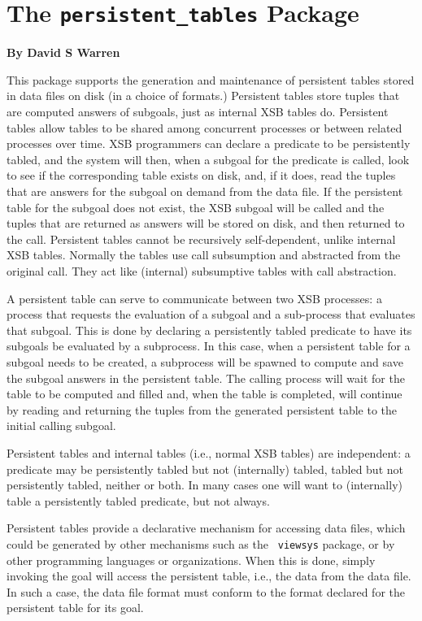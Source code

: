 
\chapter{The {\tt persistent\_tables} Package}

  \begin{center}
    {\Large {\bf By David S Warren}}
  \end{center}

This package supports the generation and maintenance of persistent
tables stored in data files on disk (in a choice of formats.)
Persistent tables store tuples that are computed answers of subgoals,
just as internal XSB tables do.  Persistent tables allow tables to be
shared among concurrent processes or between related processes over
time.  XSB programmers can declare a predicate to be persistently
tabled, and the system will then, when a subgoal for the predicate is
called, look to see if the corresponding table exists on disk, and, if
it does, read the tuples that are answers for the subgoal on demand
from the data file.  If the persistent table for the subgoal does not
exist, the XSB subgoal will be called and the tuples that are returned
as answers will be stored on disk, and then returned to the call.
Persistent tables cannot be recursively self-dependent, unlike
internal XSB tables.  Normally the tables use call subsumption and
abstracted from the original call.  They act like (internal)
subsumptive tables with call abstraction.

A persistent table can serve to communicate between two XSB processes:
a process that requests the evaluation of a subgoal and a sub-process
that evaluates that subgoal.  This is done by declaring a persistently
tabled predicate to have its subgoals be evaluated by a subprocess.
In this case, when a persistent table for a subgoal needs to be
created, a subprocess will be spawned to compute and save the subgoal
answers in the persistent table.  The calling process will wait for the
table to be computed and filled and, when the table is completed, will
continue by reading and returning the tuples from the generated
persistent table to the initial calling subgoal.

Persistent tables and internal tables (i.e., normal XSB tables) are
independent: a predicate may be persistently tabled but not (internally)
tabled, tabled but not persistently tabled, neither or both.  In many
cases one will want to (internally) table a persistently tabled
predicate, but not always.

Persistent tables provide a declarative mechanism for accessing data
files, which could be generated by other mechanisms such as the {\tt
  viewsys} package, or by other programming languages or
organizations.  When this is done, simply invoking the goal will
access the persistent table, i.e., the data from the data file.  In
such a case, the data file format must conform to the format declared
for the persistent table for its goal.

